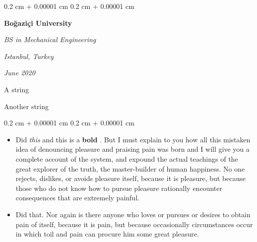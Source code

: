 \documentclass[10pt, letterpaper]{article}
\newenvironment{summary}{
    \begin{description}[
        topsep=0.10 cm,
        parsep=0.10 cm,
        partopsep=0pt,
        itemsep=0pt,
        leftmargin=0.4 cm + 10pt
    ]
}{
    \end{description}
} %
\newenvironment{highlights}{
    \begin{itemize}[
        topsep=0.10 cm,
        parsep=0.10 cm,
        partopsep=0pt,
        itemsep=0pt,
        leftmargin=0.4 cm + 10pt
    ]
}{
    \end{itemize}
} %
\newenvironment{onecolentry}{
    \begin{adjustwidth}{
        0.2 cm + 0.00001 cm
    }{
        0.2 cm + 0.00001 cm
    }
}{
    \end{adjustwidth}
} %
\newenvironment{twocolentry}[2][]{
    \onecolentry
    \def\secondColumn{#2}
    \setcolumnwidth{\fill, 4.5 cm}
    \begin{paracol}{2}
}{
    \switchcolumn \raggedleft \secondColumn
    \end{paracol}
    \endonecolentry
} %
\let\hrefWithoutArrow\href
\renewcommand{\href}[2]{\hrefWithoutArrow{#1}{\ifthenelse{\equal{#2}{}}{ }{#2 }\raisebox{.15ex}{\footnotesize \faExternalLink*}}}
\begin{document}
        \begin{twocolentry}{
        \textit{Istanbul, Turkey}    
            
        \textit{June 2020}}
            \textbf{Boğaziçi University}

            \textit{BS in Mechanical Engineering}
        \end{twocolentry}
            \begin{summary}
                \item A string
                \item Another string
            \end{summary}
        \vspace{0.10 cm}
        \begin{onecolentry}
            \begin{highlights}
                \item Did \textit{this} and this is a \textbf{bold} \href{https://example.com}{link}. But I must explain to you how all this mistaken idea of denouncing pleasure and praising pain was born and I will give you a complete account of the system, and expound the actual teachings of the great explorer of the truth, the master-builder of human happiness. No one rejects, dislikes, or avoids pleasure itself, because it is pleasure, but because those who do not know how to pursue pleasure rationally encounter consequences that are extremely painful.
                \item Did that. Nor again is there anyone who loves or pursues or desires to obtain pain of itself, because it is pain, but because occasionally circumstances occur in which toil and pain can procure him some great pleasure.
            \end{highlights}
        \end{onecolentry}


        \vspace{0.2 cm}
\end{document}
